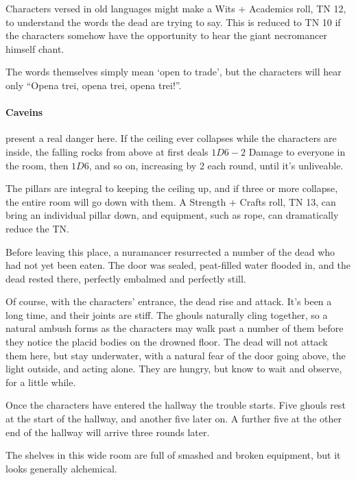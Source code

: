 \begin{multicols}{2}
Characters versed in old languages might make a Wits + Academics roll, TN 12, to understand the words the dead are trying to say.  This is reduced to TN 10 if the characters somehow have the opportunity to hear the giant necromancer himself chant.

The words themselves simply mean `open to trade', but the characters will hear only ``Opena trei, opena trei, opena trei!''.

\paragraph{Caveins} present a real danger here.  If the ceiling ever collapses while the characters are inside, the falling rocks from above at first deals $1D6-2$ Damage to everyone in the room, then $1D6$, and so on, increasing by 2 each round, until it's unliveable.


The pillars are integral to keeping the ceiling up, and if three or more collapse, the entire room will go down with them.  A Strength + Crafts roll, TN 13, can bring an individual pillar down, and equipment, such as rope, can dramatically reduce the TN.

Before leaving this place, a nuramancer resurrected a number of the dead who had not yet been eaten.  The door was sealed, peat-filled water flooded in, and the dead rested there, perfectly embalmed and perfectly still.

Of course, with the characters' entrance, the dead rise and attack.  It's been a long time, and their joints are stiff.  The ghouls naturally cling together, so a natural ambush forms as the characters may walk past a number of them before they notice the placid bodies on the drowned floor.  The dead will not attack them here, but stay underwater, with a natural fear of the door going above, the light outside, and acting alone.  They are hungry, but know to wait and observe, for a little while.

Once the characters have entered the hallway the trouble starts.  Five ghouls rest at the start of the hallway, and another five later on.  A further five at the other end of the hallway will arrive three rounds later.


\ghoul


\begin{boxtext}
	The shelves in this wide room are full of smashed and broken equipment, but it looks generally alchemical.
\end{boxtext}


\end{multicols}
